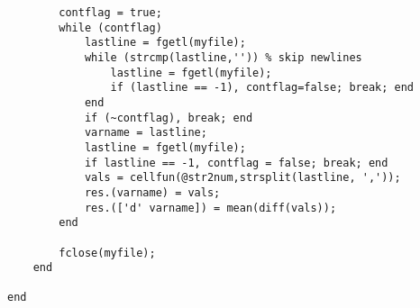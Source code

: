 \documentclass{jakedoc}
\begin{document}
\begin{lstlisting}
        contflag = true;
        while (contflag)
            lastline = fgetl(myfile);
            while (strcmp(lastline,'')) % skip newlines
                lastline = fgetl(myfile);
                if (lastline == -1), contflag=false; break; end
            end
            if (~contflag), break; end
            varname = lastline;
            lastline = fgetl(myfile);
            if lastline == -1, contflag = false; break; end
            vals = cellfun(@str2num,strsplit(lastline, ','));
            res.(varname) = vals;
            res.(['d' varname]) = mean(diff(vals));
        end
        
        fclose(myfile);
    end
 
end

\end{lstlisting}
\end{document}
